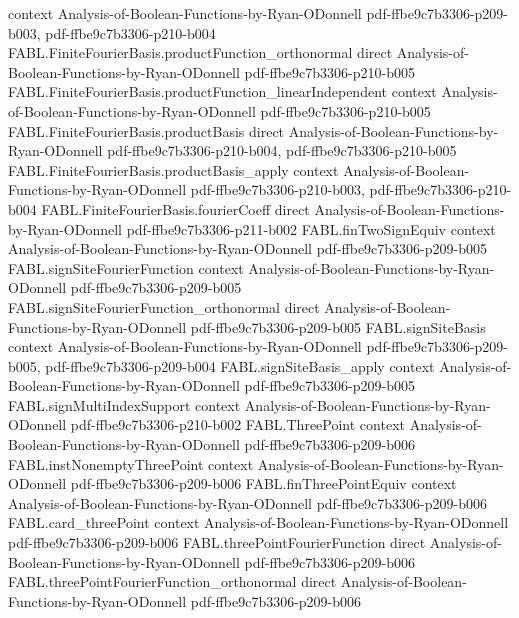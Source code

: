 \begin{theorem}
  {context}
  {Analysis-of-Boolean-Functions-by-Ryan-ODonnell}
  {pdf-ffbe9c7b3306-p209-b003,
    pdf-ffbe9c7b3306-p210-b004}
\proofstep
  {FABL.FiniteFourierBasis.productFunction_orthonormal}
  {direct}
  {Analysis-of-Boolean-Functions-by-Ryan-ODonnell}
  {pdf-ffbe9c7b3306-p210-b005}
\proofstep
  {FABL.FiniteFourierBasis.productFunction_linearIndependent}
  {context}
  {Analysis-of-Boolean-Functions-by-Ryan-ODonnell}
  {pdf-ffbe9c7b3306-p210-b005}
\proofstep
  {FABL.FiniteFourierBasis.productBasis}
  {direct}
  {Analysis-of-Boolean-Functions-by-Ryan-ODonnell}
  {pdf-ffbe9c7b3306-p210-b004,
    pdf-ffbe9c7b3306-p210-b005}
\proofstep
  {FABL.FiniteFourierBasis.productBasis_apply}
  {context}
  {Analysis-of-Boolean-Functions-by-Ryan-ODonnell}
  {pdf-ffbe9c7b3306-p210-b003,
    pdf-ffbe9c7b3306-p210-b004}
\proofstep
  {FABL.FiniteFourierBasis.fourierCoeff}
  {direct}
  {Analysis-of-Boolean-Functions-by-Ryan-ODonnell}
  {pdf-ffbe9c7b3306-p211-b002}
\proofstep
  {FABL.finTwoSignEquiv}
  {context}
  {Analysis-of-Boolean-Functions-by-Ryan-ODonnell}
  {pdf-ffbe9c7b3306-p209-b005}
\proofstep
  {FABL.signSiteFourierFunction}
  {context}
  {Analysis-of-Boolean-Functions-by-Ryan-ODonnell}
  {pdf-ffbe9c7b3306-p209-b005}
\proofstep
  {FABL.signSiteFourierFunction_orthonormal}
  {direct}
  {Analysis-of-Boolean-Functions-by-Ryan-ODonnell}
  {pdf-ffbe9c7b3306-p209-b005}
\proofstep
  {FABL.signSiteBasis}
  {context}
  {Analysis-of-Boolean-Functions-by-Ryan-ODonnell}
  {pdf-ffbe9c7b3306-p209-b005,
    pdf-ffbe9c7b3306-p209-b004}
\proofstep
  {FABL.signSiteBasis_apply}
  {context}
  {Analysis-of-Boolean-Functions-by-Ryan-ODonnell}
  {pdf-ffbe9c7b3306-p209-b005}
\proofstep
  {FABL.signMultiIndexSupport}
  {context}
  {Analysis-of-Boolean-Functions-by-Ryan-ODonnell}
  {pdf-ffbe9c7b3306-p210-b002}
\proofstep
  {FABL.ThreePoint}
  {context}
  {Analysis-of-Boolean-Functions-by-Ryan-ODonnell}
  {pdf-ffbe9c7b3306-p209-b006}
\proofstep
  {FABL.instNonemptyThreePoint}
  {context}
  {Analysis-of-Boolean-Functions-by-Ryan-ODonnell}
  {pdf-ffbe9c7b3306-p209-b006}
\proofstep
  {FABL.finThreePointEquiv}
  {context}
  {Analysis-of-Boolean-Functions-by-Ryan-ODonnell}
  {pdf-ffbe9c7b3306-p209-b006}
\proofstep
  {FABL.card_threePoint}
  {context}
  {Analysis-of-Boolean-Functions-by-Ryan-ODonnell}
  {pdf-ffbe9c7b3306-p209-b006}
\proofstep
  {FABL.threePointFourierFunction}
  {direct}
  {Analysis-of-Boolean-Functions-by-Ryan-ODonnell}
  {pdf-ffbe9c7b3306-p209-b006}
\proofstep
  {FABL.threePointFourierFunction_orthonormal}
  {direct}
  {Analysis-of-Boolean-Functions-by-Ryan-ODonnell}
  {pdf-ffbe9c7b3306-p209-b006}

\end{theorem}
